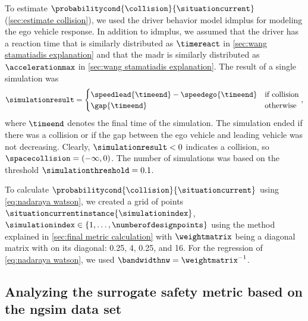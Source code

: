 To estimate $\probabilitycond{\collision}{\situationcurrent}$ (\cref{sec:estimate collision}), we used the driver behavior model \ac{idmplus} \autocite{schakel2010effects} for modeling the ego vehicle response.
In addition to \ac{idmplus}, we assumed that the driver has a reaction time that is similarly distributed as $\timereact$ in \cref{sec:wang stamatiadis explanation} and that the \ac{madr} is similarly distributed as $\accelerationmax$ in \cref{sec:wang stamatiadis explanation}.
The result of a single simulation was
\begin{equation}
	\simulationresult = \begin{cases}
		\speedlead{\timeend} - \speedego{\timeend} & \text{if collision} \\
		\gap{\timeend} & \text{otherwise}
	\end{cases},
\end{equation}
where $\timeend$ denotes the final time of the simulation.
The simulation ended if there was a collision or if the gap between the ego vehicle and leading vehicle was not decreasing.
Clearly, $\simulationresult<0$ indicates a collision, so $\spacecollision=(-\infty, 0)$.
The number of simulations was based on the threshold $\simulationthreshold=0.1$.

To calculate $\probabilitycond{\collision}{\situationcurrent}$ using \cref{eq:nadaraya watson}, we created a grid of points $\situationcurrentinstance{\simulationindex}$, $\simulationindex\in\{1,\ldots,\numberofdesignpoints\}$ using the method explained in \cref{sec:final metric calculation} with $\weightmatrix$ being a diagonal matrix with on its diagonal: 0.25, 4, 0.25, and 16.
For the regression of \cref{eq:nadaraya watson}, we used $\bandwidthnw=\weightmatrix^{-1}$.



\subsection{Analyzing the surrogate safety metric based on the \acs{ngsim} data set}
\label{sec:analyzing ngsim metric}

